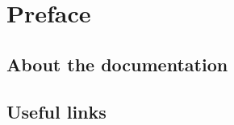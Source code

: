 \section{Preface} \label{sec:preface}

\subsection{About the documentation}

\subsection{Useful links}
